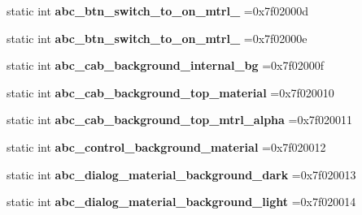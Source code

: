 \begin{DoxyCompactItemize}
static int {\bfseries abc\+\_\+btn\+\_\+switch\+\_\+to\+\_\+on\+\_\+mtrl\+\_} =0x7f02000d
\item 
\mbox{\label{classandroid_1_1support_1_1v7_1_1cardview_1_1R_1_1drawable_acc42fd3af190ebf5d65dd6e34cb8bac3}} 
static int {\bfseries abc\+\_\+btn\+\_\+switch\+\_\+to\+\_\+on\+\_\+mtrl\+\_} =0x7f02000e
\item 
\mbox{\label{classandroid_1_1support_1_1v7_1_1cardview_1_1R_1_1drawable_ad9a1ccc12642a5bb3596ddc54d95ba70}} 
static int {\bfseries abc\+\_\+cab\+\_\+background\+\_\+internal\+\_\+bg} =0x7f02000f
\item 
\mbox{\label{classandroid_1_1support_1_1v7_1_1cardview_1_1R_1_1drawable_ac706b513f80cacb38aa2bf1dbf329c37}} 
static int {\bfseries abc\+\_\+cab\+\_\+background\+\_\+top\+\_\+material} =0x7f020010
\item 
\mbox{\label{classandroid_1_1support_1_1v7_1_1cardview_1_1R_1_1drawable_a14de8847f271c9eae10e009dc05a25d5}} 
static int {\bfseries abc\+\_\+cab\+\_\+background\+\_\+top\+\_\+mtrl\+\_\+alpha} =0x7f020011
\item 
\mbox{\label{classandroid_1_1support_1_1v7_1_1cardview_1_1R_1_1drawable_a59baacea40c6cfc7eee55fe31eb5325d}} 
static int {\bfseries abc\+\_\+control\+\_\+background\+\_\+material} =0x7f020012
\item 
\mbox{\label{classandroid_1_1support_1_1v7_1_1cardview_1_1R_1_1drawable_a4bcf920d3d57d26bfd1014cabed7dce2}} 
static int {\bfseries abc\+\_\+dialog\+\_\+material\+\_\+background\+\_\+dark} =0x7f020013
\item 
\mbox{\label{classandroid_1_1support_1_1v7_1_1cardview_1_1R_1_1drawable_ac025c08cbd51ebfdf2b22788773dbd5d}} 
static int {\bfseries abc\+\_\+dialog\+\_\+material\+\_\+background\+\_\+light} =0x7f020014
\item 

\end{DoxyCompactItemize}
